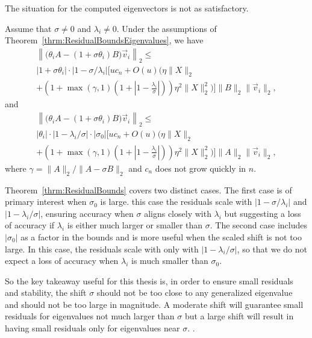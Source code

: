 The situation for the computed eigenvectors is not as satisfactory.
\begin{theorem}\label{thrm:ResidualBounds}
	Assume that $\sigma\neq 0$ and $\lambda_i\neq 0$.  Under the assumptions of Theorem~\ref{thrm:ResidualBoundsEigenvalues}, we have
	\begin{multline*}
		\left\| \big(\theta_i A - (1+\sigma \theta_i) B\big) \vec{v}_i \right\|_2
		\leq \\
		|1+\sigma \theta_i| \cdot |1-\sigma/\lambda_i| \Bigg[
		uc_n +O(u)\Bigg( \eta\|X\|_2 \\
		+ \left(1 + \max(\gamma, 1)
		\left(1+ \left| 1 - \frac{\lambda_i}{\sigma}\right|\right)\right)
		\eta^2\|X\|_2^2 \Bigg) \Bigg] \|B\|_2 \|\vec{v}_i\|_2,
	\end{multline*}
	and
	\begin{multline*}
		\left\| \big(\theta_i A - (1+\sigma \theta_i) B\big) \vec{v}_i \right\|_2
		\leq \\
		|\theta_i| \cdot |1-\lambda_i/\sigma| \cdot |\sigma_0| \Bigg[
		uc_n +O(u)\Bigg( \eta\|X\|_2 \\
		+ \left(1 + \max(\gamma, 1) \left(1+ \left| 1
		- \frac{\lambda_i}{\sigma}\right|\right)\right)
		\eta^2\|X\|_2^2 \Bigg) \Bigg] \|A\|_2 \|\vec{v}_i\|_2,
	\end{multline*}
        where $\gamma = \|A\|_2/ \|A-\sigma B\|_2$ and $c_n$ does not grow quickly in $n$.
\end{theorem}

Theorem~\ref{thrm:ResidualBounds} covers two distinct cases. The first case is of primary interest when $\sigma_0$ is large.  this case the residuals scale with $\lvert 1 - \sigma/ \lambda_i \rvert$ and $\lvert 1 - \lambda_i/\sigma\rvert$, ensuring accuracy when $\sigma$ aligns  closely with $\lambda_i$ but suggesting a loss of accuracy if $\lambda_i$ is either much larger or smaller than $\sigma$. The second case includes $|\sigma_0|$ as a factor in the bounds and is more useful when the scaled shift is not too large.  In this case, the residuals scale with only with $\lvert 1 - \lambda_i/\sigma\rvert$, so that we do not expect a loss of accuracy when $\lambda_i$ is much smaller than $\sigma_0$.

So the key takeaway useful for this thesis is, in order to ensure small residuals and stability, the shift $\sigma$ should not be too close to any generalized eigenvalue and should not be too large in magnitude. A moderate shift will guarantee small residuals for eigenvalues not much larger than $\sigma$ but a large shift will result in having small residuals only for eigenvalues near $\sigma$.  .

